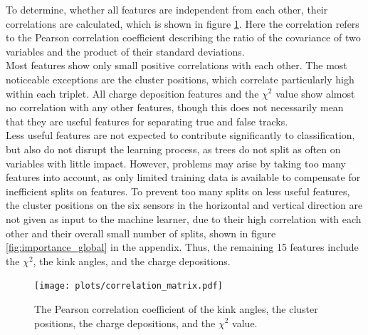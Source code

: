 To determine, whether all features are independent from each other, their correlations are calculated, which is shown in figure \ref{fig:corr}. Here the correlation
refers to the Pearson correlation coefficient \cite{pearson} describing the ratio of the covariance of two variables and the product of their standard deviations. \\
Most features show only small positive correlations with each other. The most noticeable exceptions are the cluster positions, which correlate particularly high within each
triplet. All charge deposition features and the $\chi^2$ value show almost no correlation with any other features, though this does not necessarily mean that they are
useful features for separating true and false tracks. \\
Less useful features
are not expected to contribute significantly to classification, but also do not disrupt the learning process, as trees do not split as often on variables with little impact.
However, problems may arise by taking too many features into account, as only limited training data is available to compensate for inefficient splits on features.
To prevent too many splits on less useful features,
the cluster positions on the six sensors in the horizontal and vertical direction are not given as input to the machine learner,
due to their high correlation with each other and their overall small number of splits, shown in figure \ref{fig:importance_global} in the appendix.
Thus, the remaining 15 features include the $\chi^2$, the kink angles, and the charge depositions.
\begin{figure}
  \hspace{-2.5cm}
  \texttt{[image: plots/correlation\_matrix.pdf]}
  \vspace{-1.8cm}
  \caption{The Pearson correlation coefficient of the kink angles, the cluster positions, the charge depositions, and the $\chi^2$ value.}
  \label{fig:corr}
\end{figure}

